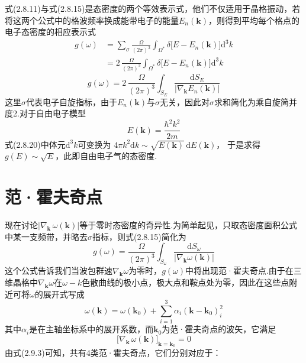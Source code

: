 式(2.8.11)与式(2.8.15)是态密度的两个等效表示式，他们不仅适用于晶格振动，若将这两个公式中的格波频率换成能带电子的能量$E_n(\boldsymbol{k})$，则得到平均每个格点的电子态密度的相应表示式
\begin{equation}
\begin{aligned}
  g(\omega)&=\sum_{\sigma}\frac{\Omega}{(2\pi)^3}\int_{\Omega^{*}}
  \delta\bigl[E-E_n(\boldsymbol{k})\bigr]\mathrm{d}^3k\\
  &=2\,\frac{\Omega}{(2\pi)^3}\int_{\Omega^{*}}
  \delta\bigl[E-E_n(\boldsymbol{k})\bigr]\mathrm{d}^3k
\end{aligned}
\end{equation}
\begin{equation}
  g(\omega)=2\,\frac{\Omega}{(2\pi)^3}
  \int_{S_E}\frac{\mathrm{d}S_E}{|\nabla_{\boldsymbol{k}}E_n(\boldsymbol{k})|}
\end{equation}
这里$\sigma$代表电子自旋指标，由于$E_n(\boldsymbol{k})$与$\sigma$无关，因此对$\sigma$求和简化为乘自旋简并度2.对于自由电子模型
\begin{equation}
  E(\boldsymbol{k})=\frac{\hbar^2k^2}{2m}
\end{equation}
式(2.8.20)中体元$\mathrm{d}^3k$可变换为
$4\pi k^2\mathrm{d}k\sim\sqrt{E(\boldsymbol{k})}\,\mathrm{d}E(\boldsymbol{k})$，
于是求得$g(E)\sim\sqrt{E}$，此即自由电子气的态密度.

\section{范·霍夫奇点}

现在讨论$|\nabla_{\boldsymbol{k}}\,\omega(\boldsymbol{k})|$等于零时态密度的奇异性.为简单起见，只取态密度面积公式中某一支频带，并略去$\sigma$指标，则式(2.8.15)简化为
\begin{equation}
  g(\omega)=\frac{\Omega}{(2\pi)^3}
  \int_{S_{\omega}}\frac{\mathrm{d}S_{\omega}}
  {|\nabla_{\boldsymbol{k}}\omega(\boldsymbol{k})|}
\end{equation}
这个公式告诉我们当波包群速$\nabla_{\boldsymbol{k}}\omega$为零时，$g(\omega)$中将出现范·霍夫奇点.由于在三维晶格中$\nabla_{\boldsymbol{k}}\omega$在$\omega-k$色散曲线的极小点，极大点和鞍点处为零，因此在这些点附近可将$\omega$的展开式写成
\begin{equation}
  \omega(\boldsymbol{k})=\omega(\boldsymbol{k}_0)
  +\sum_{i=1}^{3}\alpha_i(\boldsymbol{k}-\boldsymbol{k}_0)_i^2
\end{equation}
其中$\alpha_i$是在主轴坐标系中的展开系数，而$\boldsymbol{k}_0$为范·霍夫奇点的波矢，它满足
\begin{equation}
  \bigl[\nabla_{\boldsymbol{k}}\,\omega(\boldsymbol{k})\bigr]_{\boldsymbol{k}=\boldsymbol{k}_0}=0
\end{equation}
由式(2.9.3)可知，共有4类范·霍夫奇点，它们分别对应于：

